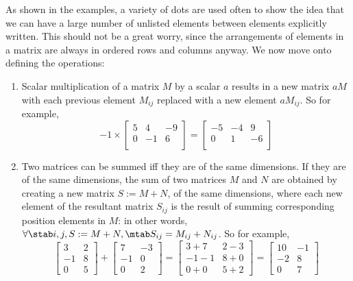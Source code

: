 As shown in the examples, a variety of dots are used often to show the idea that we can have a large number of unlisted elements between elements explicitly written. This should not be a great worry, since the arrangements of elements in a matrix are always in ordered rows and columns anyway. We now move onto defining the operations:
\begin{enumerate}
    \item Scalar multiplication of a matrix $M$ by a scalar $a$ results in a new matrix $aM$ with each previous element $M_{ij}$ replaced with a new element $aM_{ij}$. So for example,
    $$
    -1\times\begin{bmatrix}
        5 & 4 & -9 \\
        0 & -1 & 6 \\ 
    \end{bmatrix}
    =
    \begin{bmatrix}
        -5 & -4 & 9 \\
        0 & 1 & -6 \\ 
    \end{bmatrix}
    $$
    \item Two matrices can be summed iff they are of the same dimensions. If they are of the same dimensions, the sum of two matrices $M$ and $N$ are obtained by creating a new matrix $S:=M+N$, of the same dimensions, where each new element of the resultant matrix $S_{ij}$ is the result of summing corresponding position elements in $M$: in other words, $\forall\stab i,j,S:=M+N, \mtab S_{ij}=M_{ij}+N_{ij}$. So for example,
    $$
    \begin{bmatrix}
        3 & 2 \\
        -1 & 8 \\
        0 & 5
    \end{bmatrix} + 
    \begin{bmatrix}
        7 & -3 \\
        -1 & 0 \\
        0 & 2 
    \end{bmatrix} = 
     \begin{bmatrix}
        3+7 & 2-3 \\
        -1-1 & 8+0 \\
        0+0 & 5+2 
    \end{bmatrix}= \begin{bmatrix}
        10 & -1 \\
        -2 & 8 \\
        0 & 7
    \end{bmatrix}
$$
\end{enumerate}

